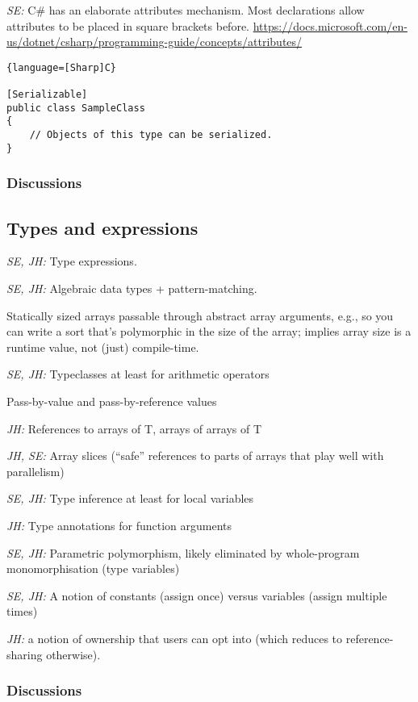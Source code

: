 \documentclass{article}
\begin{document}
\textit{SE:} C\# has an elaborate attributes mechanism.
Most declarations allow attributes to be placed in square brackets before.  \url{https://docs.microsoft.com/en-us/dotnet/csharp/programming-guide/concepts/attributes/}

\begin{lstlisting}{language=[Sharp]C}
  
[Serializable]
public class SampleClass
{
    // Objects of this type can be serialized.
} 
\end{lstlisting}

\subsubsection{Discussions}

\subsection{Types and expressions}

\textit{SE, JH:} Type expressions.

\textit{SE, JH:} Algebraic data types + pattern-matching.

Statically sized arrays passable through abstract array arguments, e.g., so you
can write a sort that's polymorphic in the size of the array; implies array size
is a runtime value, not (just) compile-time.

\textit{SE, JH:} Typeclasses at least for arithmetic operators

Pass-by-value and pass-by-reference values

\textit{JH:} References to arrays of T, arrays of arrays of T

\textit{JH, SE:} Array slices (``safe'' references to parts of arrays that play
well with parallelism)

\textit{SE, JH:} Type inference at least for local variables

\textit{JH:} Type annotations for function arguments

\textit{SE, JH:} Parametric polymorphism, likely eliminated by whole-program
monomorphisation (type variables)

\textit{SE, JH:} A notion of constants (assign once) versus variables (assign
multiple times)

\textit{JH:} a notion of ownership that users can opt into (which reduces to
reference-sharing otherwise).

\subsubsection{Discussions}
\end{document}
